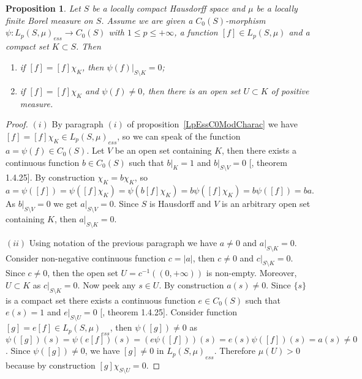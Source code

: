 \documentclass[12pt]{article}
\newtheorem{proposition}[theorem]{Proposition}
\begin{document}
\begin{proposition}\label{MorphLpEssC0Prop} Let $S$ be a locally compact
    Hausdorff space and $\mu$ be a locally finite Borel measure on $S$. Assume
    we are given a $C_0(S)$-morphism $\psi:{L_p(S,\mu)}_{ess}\to C_0(S)$ with
    $1\leq p\leq+\infty$, a function $[f]\in L_p(S,\mu)$ and a compact set
    $K\subset S$. Then
    \begin{enumerate}[label = (\roman*)]
        \item if $[f]=[f]\chi_K$, then $\psi(f)|_{S\setminus K}=0$;

        \item if $[f]=[f]\chi_K$ and $\psi(f)\neq 0$, then there is an open set
              $U\subset K$ of positive measure.
    \end{enumerate}
\end{proposition}
\begin{proof} $(i)$ By paragraph $(i)$ of proposition~\ref{LpEssC0ModCharac} we
    have $[f]=[f]\chi_K\in {L_p(S,\mu)}_{ess}$, so we can speak of the function
    $a=\psi(f)\in C_0(S)$. Let $V$ be an open set containing $K$, then there
    exists a continuous function $b\in C_0(S)$ such that $b|_K=1$ and
    $b|_{S\setminus V}=0$ [\cite{DalesBanSpContFunDualSp}, theorem 1.4.25]. By
    construction $\chi_K=b\chi_K$, so
    $a=\psi([f])=\psi([f]\chi_K)=\psi(b[f]\chi_K)=b\psi([f]\chi_K)=b\psi([f])=ba$.
    As $b|_{S\setminus V}=0$ we get $a|_{S\setminus V}=0$. Since $S$ is
    Hausdorff and $V$ is an arbitrary open set containing $K$, then
    $a|_{S\setminus K}=0$.

    $(ii)$ Using notation of the previous paragraph we have $a\neq 0$ and
    $a|_{S\setminus K}=0$. Consider non-negative continuous function $c=|a|$,
    then $c\neq 0$ and $c|_{S\setminus K}=0$. Since $c\neq 0$, then the open set
    $U=c^{-1}((0, +\infty))$ is non-empty. Moreover, $U\subset K$ as
    $c|_{S\setminus K}=0$. Now peek any $s\in U$. By construction $a(s)\neq 0$.
    Since $\{s\}$ is a compact set there exists a continuous function $e\in
        C_0(S)$ such that $e(s)=1$ and $e|_{S\setminus U}=0$
    [\cite{DalesBanSpContFunDualSp}, theorem 1.4.25]. Consider function
    $[g]=e[f]\in {L_p(S,\mu)}_{ess}$, then $\psi([g])\neq 0$ as
    $\psi([g])(s)=\psi(e[f])(s)=(e\psi([f]))(s)=e(s)\psi([f])(s)=a(s)\neq 0$.
    Since $\psi([g])\neq 0$, we have $[g]\neq 0$ in ${L_p(S,\mu)}_{ess}$.
    Therefore $\mu(U)>0$ because by construction $[g]\chi_{S\setminus U}=0$.
\end{proof}
\end{document}
